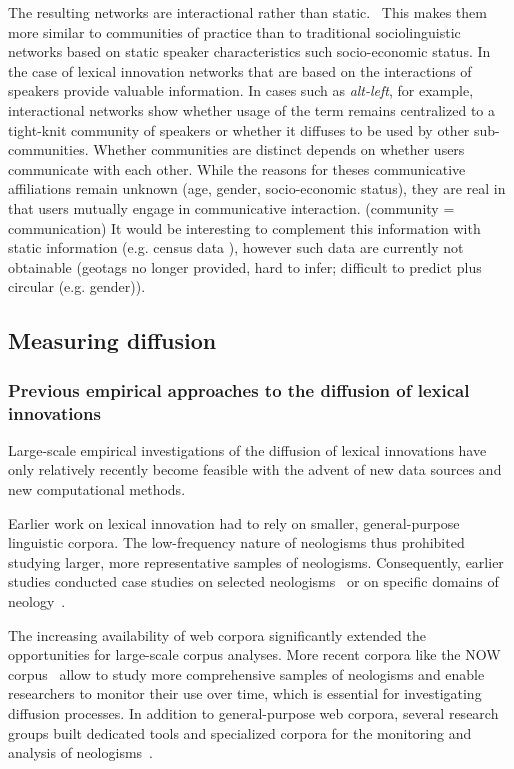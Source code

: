 \documentclass[
  a4paper,
  abstract=on,
  captions=tableabove
  ]{scrartcl}
\begin{document}
          The resulting networks are interactional rather than static.~\parencite{Goel2016SocialDynamics} This makes them more similar to communities of practice than to traditional sociolinguistic networks based on static speaker characteristics such socio-economic status.
          In the case of lexical innovation networks that are based on the interactions of speakers provide valuable information. In cases such as \emph{alt-left}, for example, interactional networks show whether usage of the term remains centralized to a tight-knit community of speakers or whether it diffuses to be used by other sub-communities.
          Whether communities are distinct depends on whether users communicate with each other. While the reasons for theses communicative affiliations remain unknown (age, gender, socio-economic status), they are real in that users mutually engage in communicative interaction. (community = communication)
          It would be interesting to complement this information with static information (e.g. census data \parencite{Eisenstein2014DiffusionLexical}), however such data are currently not obtainable (geotags no longer provided, hard to infer; difficult to predict plus circular (e.g. gender)).


  \subsection{Measuring diffusion}
  
    \subsubsection{Previous empirical approaches to the diffusion of lexical innovations}

      Large-scale empirical investigations of the diffusion of lexical innovations have only relatively recently become feasible with the advent of new data sources and new computational methods.

      Earlier work on lexical innovation had to rely on smaller, general-purpose linguistic corpora. The low-frequency nature of neologisms thus prohibited studying larger, more representative samples of neologisms. Consequently, earlier studies conducted case studies on selected neologisms~\parencite{Hohenhaus2006BouncebackabilityWebascorpusbased} or on specific domains of neology~\parencite{Elsen2004Neologismen}.

      The increasing availability of web corpora significantly extended the opportunities for large-scale corpus analyses. More recent corpora like the NOW corpus~\parencite{Davies2013CorpusNews} allow to study more comprehensive samples of neologisms and enable researchers to monitor their use over time, which is essential for investigating diffusion processes. In addition to general-purpose web corpora, several research groups built dedicated tools and specialized corpora for the monitoring and analysis of neologisms~\parencite{Renouf2006WebCorpIntegrated, Kerremans2012NeoCrawlerIdentifying,LemnitzerWortwarte,Gerard2017LogoscopeSemiautomatic,Cartier2017NeoveilleWeb}.
\end{document}
